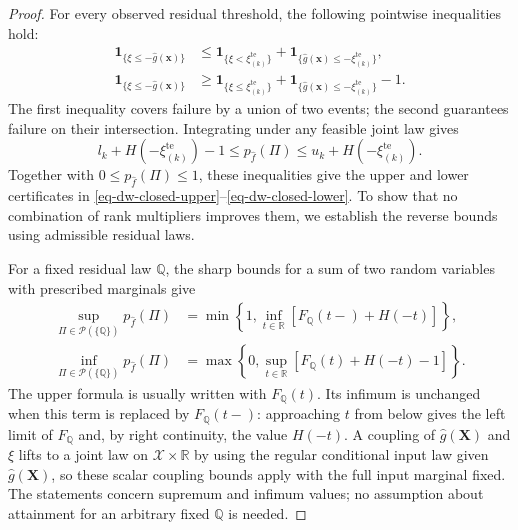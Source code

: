 \begin{proof}
  For every observed residual threshold, the following pointwise inequalities hold:
  \begin{align}
    \mathbf1_{\{\xi\le-\hat g(\bm x)\}}
    &\le\mathbf1_{\{\xi<\xi_{(k)}^{\mathrm{te}}\}}
      +\mathbf1_{\{\hat g(\bm x)\le-\xi_{(k)}^{\mathrm{te}}\}},
      \label{eq-upper-threshold-certificate}\\
    \mathbf1_{\{\xi\le-\hat g(\bm x)\}}
    &\ge\mathbf1_{\{\xi\le\xi_{(k)}^{\mathrm{te}}\}}
      +\mathbf1_{\{\hat g(\bm x)\le-\xi_{(k)}^{\mathrm{te}}\}}-1.
      \label{eq-lower-threshold-certificate}
  \end{align}
  The first inequality covers failure by a union of two events; the second guarantees failure on their intersection. Integrating under any feasible joint law gives
  \begin{equation}
    l_k+H\left(-\xi_{(k)}^{\mathrm{te}}\right)-1
    \le p_{\hat f}(\Pi)
    \le u_k+H\left(-\xi_{(k)}^{\mathrm{te}}\right).
    \label{eq-rankwise-failure-bounds}
  \end{equation}
  Together with $0\le p_{\hat f}(\Pi)\le1$, these inequalities give the upper and lower certificates in \eqref{eq-dw-closed-upper}--\eqref{eq-dw-closed-lower}. To show that no combination of rank multipliers improves them, we establish the reverse bounds using admissible residual laws.

  For a fixed residual law $\mathbb Q$, the sharp bounds for a sum of two random variables with prescribed marginals give \citep{M82,Z.R25}
  \begin{align}
    \sup_{\Pi\in\mathcal P(\{\mathbb Q\})}p_{\hat f}(\Pi)
    &=\min\left\{1,\inf_{t\in\mathbb R}\left[F_{\mathbb Q}(t-)+H(-t)\right]\right\},
      \label{eq-fixed-residual-upper}\\
    \inf_{\Pi\in\mathcal P(\{\mathbb Q\})}p_{\hat f}(\Pi)
    &=\max\left\{0,\sup_{t\in\mathbb R}\left[F_{\mathbb Q}(t)+H(-t)-1\right]\right\}.
      \label{eq-fixed-residual-lower}
  \end{align}
  The upper formula is usually written with $F_{\mathbb Q}(t)$. Its infimum is unchanged when this term is replaced by $F_{\mathbb Q}(t-)$: approaching $t$ from below gives the left limit of $F_{\mathbb Q}$ and, by right continuity, the value $H(-t)$. A coupling of $\hat g(\bm X)$ and $\xi$ lifts to a joint law on $\mathcal X\times\mathbb R$ by using the regular conditional input law given $\hat g(\bm X)$, so these scalar coupling bounds apply with the full input marginal fixed. The statements concern supremum and infimum values; no assumption about attainment for an arbitrary fixed $\mathbb Q$ is needed.


\end{proof}
